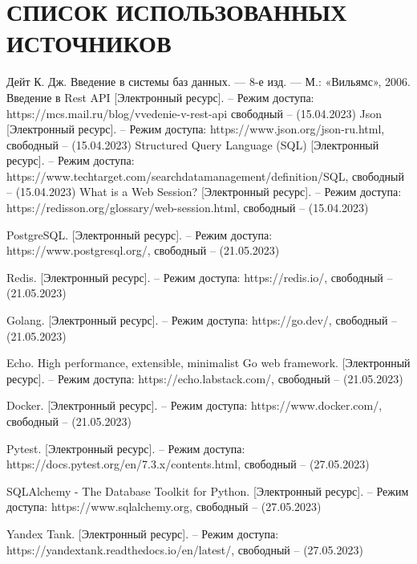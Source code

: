 \section*{СПИСОК ИСПОЛЬЗОВАННЫХ ИСТОЧНИКОВ}

\begingroup
\renewcommand{\section}[2]{}
\begin{thebibliography}{}
	Дейт К. Дж. Введение в системы баз данных. — 8-е изд. — М.: «Вильямс»,
	2006.
	Введение в Rest API [Электронный ресурс]. – Режим доступа:
	https://mcs.mail.ru/blog/vvedenie-v-rest-api
	свободный – (15.04.2023)
	Json [Электронный ресурс]. – Режим доступа:
	https://www.json.org/json-ru.html,
	свободный – (15.04.2023)
	Structured Query Language (SQL) [Электронный ресурс]. – Режим доступа:
	https://www.techtarget.com/searchdatamanagement/definition/SQL,
	свободный – (15.04.2023)
	What is a Web Session? [Электронный ресурс]. – Режим доступа:
	https://redisson.org/glossary/web-session.html,
	свободный – (15.04.2023)

	PostgreSQL. [Электронный ресурс]. – Режим доступа:
	https://www.postgresql.org/,
	свободный – (21.05.2023)
	
	Redis. [Электронный ресурс]. – Режим доступа:
	https://redis.io/,
	свободный – (21.05.2023)
	
	Golang. [Электронный ресурс]. – Режим доступа:
	https://go.dev/,
	свободный – (21.05.2023)
	
	Echo. High performance, extensible, minimalist Go web framework. [Электронный ресурс]. – Режим доступа:
	https://echo.labstack.com/,
	свободный – (21.05.2023)
	
	Docker. [Электронный ресурс]. – Режим доступа:
	https://www.docker.com/,
	свободный – (21.05.2023)
	
	Pytest. [Электронный ресурс]. – Режим доступа:
	https://docs.pytest.org/en/7.3.x/contents.html,
	свободный – (27.05.2023)
	
	SQLAlchemy - The Database Toolkit for Python. [Электронный ресурс]. – Режим доступа:
	https://www.sqlalchemy.org,
	свободный – (27.05.2023)
	
	Yandex Tank. [Электронный ресурс]. – Режим доступа:
	https://yandextank.readthedocs.io/en/latest/,
	свободный – (27.05.2023)
	

\end{thebibliography}
